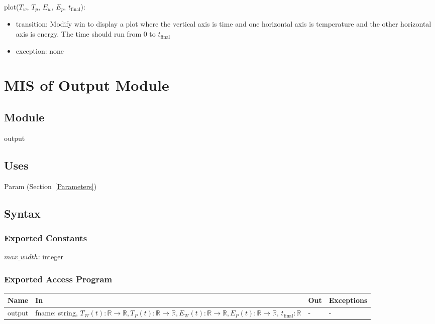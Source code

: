 \documentclass[12pt, titlepage]{article}
\begin{document}
\noindent plot($T_w$, $T_p$, $E_w$, $E_p$, $t_\text{final}$):
\begin{itemize}
\item transition: Modify win to display a plot where the vertical axis
  is time and one horizontal axis is temperature and the other
  horizontal axis is energy.  The time should run from $0$ to $t_\text{final}$
\item exception: none
\end{itemize}

\newpage

\section{MIS of Output Module} \label{Output}

\subsection{Module}

output

\subsection{Uses}

Param (Section~\ref{Parameters})

\subsection{Syntax}

\subsubsection{Exported Constants}

$max\_width$: integer

\subsubsection{Exported Access Program}

\begin{center}
\begin{tabular}{p{3cm} p{7cm} p{2cm} p{2cm}}
\hline
\textbf{Name} & \textbf{In} & \textbf{Out} & \textbf{Exceptions} \\
\hline
output & fname: string, $T_W(t):\mathbb{R} \rightarrow \mathbb{R},
                 T_P(t):\mathbb{R} \rightarrow \mathbb{R},
                 E_W(t):\mathbb{R} \rightarrow \mathbb{R},
       E_P(t):\mathbb{R} \rightarrow \mathbb{R}$, $t_\text{final}: \mathbb{R}$ & - & - \\
\hline
\end{tabular}
\end{center}
\end{document}
